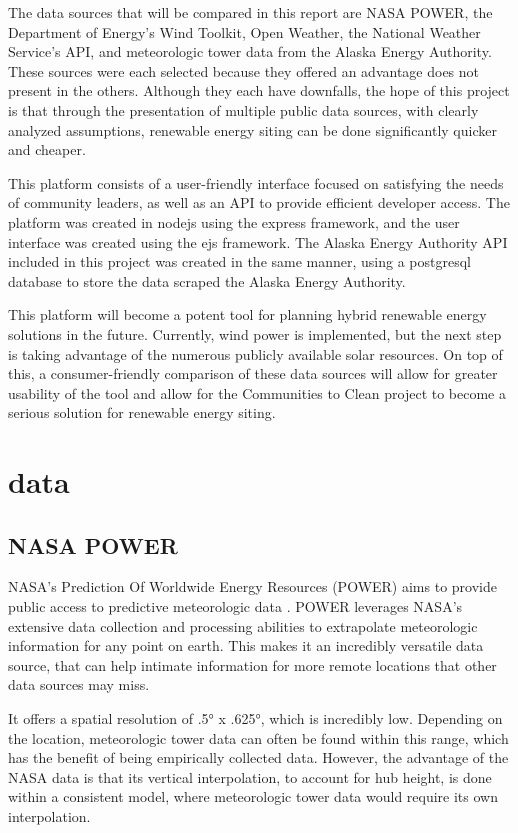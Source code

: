 \documentclass[12pt, oneside]{article}   	%
\begin{document}
The data sources that will be compared in this report are NASA POWER, the
Department of Energy's Wind Toolkit, Open Weather, the National Weather
Service's API, and meteorologic tower data from the Alaska Energy Authority.
These sources were each selected because they offered an advantage does not
present in the others. Although they each have downfalls, the hope of this
project is that through the presentation of multiple public data sources, with
clearly analyzed assumptions, renewable energy siting can be done significantly
quicker and cheaper.

This platform consists of a user-friendly interface focused on satisfying the
needs of community leaders, as well as an API to provide efficient developer
access. The platform was created in nodejs using the express framework, and the
user interface was created using the ejs framework. The Alaska Energy Authority
API included in this project was created in the same manner, using a postgresql
database to store the data scraped the Alaska Energy Authority.

This platform will become a potent tool for planning hybrid renewable energy
solutions in the future. Currently, wind power is implemented, but the next step
is taking advantage of the numerous publicly available solar resources. On top
of this, a consumer-friendly comparison of these data sources will allow for
greater usability of the tool and allow for the Communities to Clean project to
become a serious solution for renewable energy siting.

\section{data}
\subsection{NASA POWER}
NASA's Prediction Of Worldwide Energy Resources (POWER) aims to provide public
access to predictive meteorologic data \cite{NASA-POWER-HOME}. POWER leverages
NASA's extensive data collection and processing abilities to extrapolate
meteorologic information for any point on earth. This makes it an incredibly
versatile data source, that can help intimate information for more remote
locations that other data sources may miss.

It offers a spatial resolution of .5° x .625°, which is incredibly low.
Depending on the location, meteorologic tower data can often be found within
this range, which has the benefit of being empirically collected data. However,
the advantage of the NASA data is that its vertical interpolation, to account
for hub height, is done within a consistent model, where meteorologic tower data
would require its own interpolation.
\end{document}
